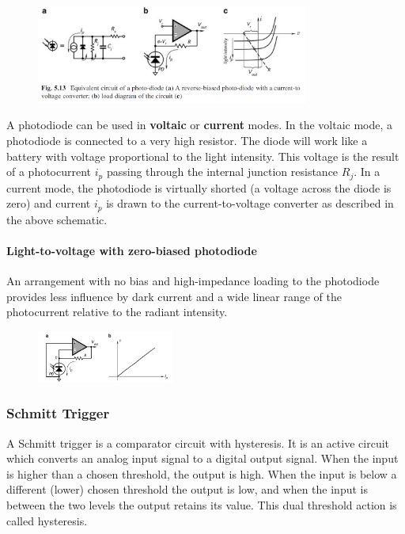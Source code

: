 \begin{figure}[H]
    \centering
    \includegraphics[width = 0.8\textwidth]{L4/img/photodiode.PNG}
\end{figure}

A photodiode can be used in \textbf{voltaic} or \textbf{current} modes. In the voltaic mode, a
photodiode is connected to a very high resistor. The diode will work like a battery with voltage proportional to the light intensity. This voltage is the result of a photocurrent $i_p$ passing through the internal
junction resistance $R_j$. In a current mode, the photodiode is virtually shorted
(a voltage across the diode is zero) and current $i_p$ is drawn to the current-to-voltage
converter as described in the above schematic. 


\paragraph{Light-to-voltage with zero-biased photodiode}

An arrangement with no
bias and high-impedance loading to the photodiode provides less influence by dark
current and a wide linear range of the photocurrent relative to the radiant intensity.

\begin{figure}[H]
    \centering
    \includegraphics[width = 0.4\textwidth]{L4/img/zero-biased.PNG}
\end{figure}

\subsubsection{Schmitt Trigger}

A Schmitt trigger is a comparator circuit with hysteresis. It is an active circuit which converts an analog input signal to a digital output signal. When the input is higher than a chosen threshold, the output is high. When the input is below a different (lower) chosen threshold the output is low, and when the input is between the two levels the output retains its value. This dual threshold action is called hysteresis.

